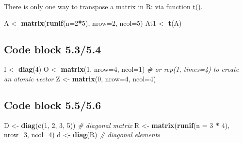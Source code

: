 \documentclass[
]{book}
\newenvironment{Shaded}{\begin{snugshade}}{\end{snugshade}}
\newcommand{\CommentTok}[1]{\textcolor[rgb]{0.56,0.35,0.01}{\textit{#1}}}
\newcommand{\DataTypeTok}[1]{\textcolor[rgb]{0.13,0.29,0.53}{#1}}
\newcommand{\DecValTok}[1]{\textcolor[rgb]{0.00,0.00,0.81}{#1}}
\newcommand{\KeywordTok}[1]{\textcolor[rgb]{0.13,0.29,0.53}{\textbf{#1}}}
\newcommand{\NormalTok}[1]{#1}
\newcommand{\OperatorTok}[1]{\textcolor[rgb]{0.81,0.36,0.00}{\textbf{#1}}}
\newcommand{\StringTok}[1]{\textcolor[rgb]{0.31,0.60,0.02}{#1}}
\begin{document}
There is only one way to transpose a matrix in R: via function \href{https://stat.ethz.ch/R-manual/R-devel/library/base/html/t.html}{t()}.

\begin{Shaded}
\begin{Highlighting}[]
\NormalTok{A \textless{}{-}}\StringTok{ }\KeywordTok{matrix}\NormalTok{(}\KeywordTok{runif}\NormalTok{(}\DataTypeTok{n=}\DecValTok{2}\OperatorTok{*}\DecValTok{5}\NormalTok{), }\DataTypeTok{nrow=}\DecValTok{2}\NormalTok{, }\DataTypeTok{ncol=}\DecValTok{5}\NormalTok{)}
\NormalTok{At1 \textless{}{-}}\StringTok{ }\KeywordTok{t}\NormalTok{(A)}
\end{Highlighting}
\end{Shaded}

\hypertarget{code-block-5.35.4}{%
\subsection*{Code block 5.3/5.4}\label{code-block-5.35.4}}

\begin{Shaded}
\begin{Highlighting}[]
\NormalTok{I \textless{}{-}}\StringTok{ }\KeywordTok{diag}\NormalTok{(}\DecValTok{4}\NormalTok{)}
\NormalTok{O \textless{}{-}}\StringTok{ }\KeywordTok{matrix}\NormalTok{(}\DecValTok{1}\NormalTok{, }\DataTypeTok{nrow=}\DecValTok{4}\NormalTok{, }\DataTypeTok{ncol=}\DecValTok{1}\NormalTok{) }\CommentTok{\# or rep(1, times=4) to create an atomic vector}
\NormalTok{Z \textless{}{-}}\StringTok{ }\KeywordTok{matrix}\NormalTok{(}\DecValTok{0}\NormalTok{, }\DataTypeTok{nrow=}\DecValTok{4}\NormalTok{, }\DataTypeTok{ncol=}\DecValTok{4}\NormalTok{)}
\end{Highlighting}
\end{Shaded}

\hypertarget{code-block-5.55.6}{%
\subsection*{Code block 5.5/5.6}\label{code-block-5.55.6}}

\begin{Shaded}
\begin{Highlighting}[]
\NormalTok{D \textless{}{-}}\StringTok{ }\KeywordTok{diag}\NormalTok{(}\KeywordTok{c}\NormalTok{(}\DecValTok{1}\NormalTok{, }\DecValTok{2}\NormalTok{, }\DecValTok{3}\NormalTok{, }\DecValTok{5}\NormalTok{))  }\CommentTok{\# diagonal matrix}
\NormalTok{R \textless{}{-}}\StringTok{ }\KeywordTok{matrix}\NormalTok{(}\KeywordTok{runif}\NormalTok{(}\DataTypeTok{n =} \DecValTok{3} \OperatorTok{*}\StringTok{ }\DecValTok{4}\NormalTok{), }\DataTypeTok{nrow=}\DecValTok{3}\NormalTok{, }\DataTypeTok{ncol=}\DecValTok{4}\NormalTok{)}
\NormalTok{d \textless{}{-}}\StringTok{ }\KeywordTok{diag}\NormalTok{(R) }\CommentTok{\# diagonal elements}
\end{Highlighting}
\end{Shaded}
\end{document}
